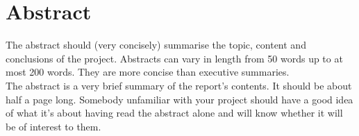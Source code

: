 \section*{Abstract}
The abstract should (very concisely) summarise the
topic, content and conclusions of the project.
Abstracts can vary in length from 50 words up to at
most 200 words. They are more concise than
executive summaries. \\ \newline \noindent The abstract is a very brief summary of
the report's contents. It should be about half a
page long. Somebody unfamiliar with your
project should have a good idea of what it's
about having read the abstract alone and will
know whether it will be of interest to them.
